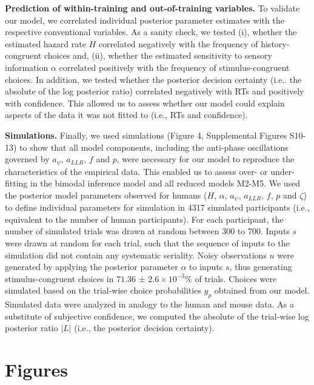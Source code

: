 \documentclass[
]{article}
\begin{document}
\textbf{Prediction of within-training and out-of-training variables.} To
validate our model, we correlated individual posterior parameter
estimates with the respective conventional variables. As a sanity check,
we tested (i), whether the estimated hazard rate \(H\) correlated
negatively with the frequency of history-congruent choices and, (ii),
whether the estimated sensitivity to sensory information \(\alpha\)
correlated positively with the frequency of stimulus-congruent choices.
In addition, we tested whether the posterior decision certainty (i.e..
the absolute of the log posterior ratio) correlated negatively with RTs
and positively with confidence. This allowed us to assess whether our
model could explain aspects of the data it was not fitted to (i.e., RTs
and confidence).

\textbf{Simulations.} Finally, we used simulations (Figure 4,
Supplemental Figures S10-13) to show that all model components,
including the anti-phase oscillations governed by \(a_{\psi}\),
\(a_{LLR}\), \(f\) and \(p\), were necessary for our model to reproduce
the characteristics of the empirical data. This enabled us to assess
over- or under-fitting in the bimodal inference model and all reduced
models M2-M5. We used the posterior model parameters observed for humans
(\(H\), \(\alpha\), \(a_{\psi}\), \(a_{LLR}\), \(f\), \(p\) and
\(\zeta\)) to define individual parameters for simulation in 4317
simulated participants (i.e., equivalent to the number of human
participants). For each participant, the number of simulated trials was
drawn at random between 300 to 700. Inputs \(s\) were drawn at random
for each trial, such that the sequence of inputs to the simulation did
not contain any systematic seriality. Noisy observations \(u\) were
generated by applying the posterior parameter \(\alpha\) to inputs
\(s\), thus generating stimulus-congruent choices in \(71.36\) ±
\(\ensuremath{2.6\times 10^{-3}}\)\% of trials. Choices were simulated
based on the trial-wise choice probabilities \(y_{p}\) obtained from our
model. Simulated data were analyzed in analogy to the human and mouse
data. As a substitute of subjective confidence, we computed the absolute
of the trial-wise log posterior ratio \(|L|\) (i.e., the posterior
decision certainty).

\newpage

\hypertarget{figures}{%
\section{Figures}\label{figures}}
\end{document}
